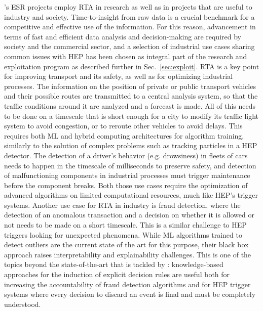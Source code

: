 \acronym's ESR projects employ RTA in research as well as in projects that are useful to industry and society. 
Time-to-insight from raw data is a crucial benchmark for a competitive and effective use of the information. For this reason, advancement in terms of fast and efficient data analysis and decision-making are required by society and the commercial sector, and a selection of industrial use cases sharing common issues with HEP has been chosen as integral part of the \acronym research and exploitation program as described further in Sec.~\ref{sec:exploit}.  
RTA is a key point for improving transport and its safety, as well as for optimizing industrial processes. 
The information on the position of private or public transport vehicles and their possible routes are transmitted to a central analysis system, so that the traffic conditions around it are analyzed and a forecast is made. 
All of this needs to be done on a timescale that is short enough for a city to modify its traffic light system to avoid congestion, or to reroute other vehicles to avoid delays. 
This requires both ML and hybrid computing architectures for algorithm training, similarly to the solution of complex problems such as tracking particles in a HEP detector. 
The detection of a driver's behavior (e.g. drowsiness) in fleets of cars needs to happen in the timescale of milliseconds to preserve safety, and detection of malfunctioning components in industrial processes must trigger maintenance before the component breaks. Both those use cases require the optimization of advanced algorithms on limited computational resources, much like HEP's trigger systems.
Another use case for RTA in industry is fraud detection, where the detection of an anomalous transaction and a decision on whether it is allowed or not needs to be made on a short timescale. This is a similar challenge to HEP triggers looking for unexpected phenomena. 
While ML algorithms trained to detect outliers are the current state of the art for this purpose, their black box approach raises interpretability and explainability challenges. 
This is one of the topics beyond the state-of-the-art that is tackled by \acronym: knowledge-based approaches for the induction of explicit decision rules are useful both for increasing the accountability of fraud detection algorithms and for HEP trigger systems where every decision to discard an event is final and must be completely understood.\\ 

